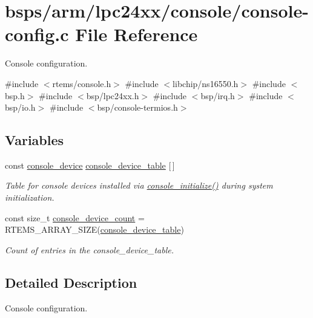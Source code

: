 \hypertarget{arm_2lpc24xx_2console_2console-config_8c}{}\section{bsps/arm/lpc24xx/console/console-\/config.c File Reference}
\label{arm_2lpc24xx_2console_2console-config_8c}


Console configuration.  


{\ttfamily \#include $<$rtems/console.\+h$>$}\newline
{\ttfamily \#include $<$libchip/ns16550.\+h$>$}\newline
{\ttfamily \#include $<$bsp.\+h$>$}\newline
{\ttfamily \#include $<$bsp/lpc24xx.\+h$>$}\newline
{\ttfamily \#include $<$bsp/irq.\+h$>$}\newline
{\ttfamily \#include $<$bsp/io.\+h$>$}\newline
{\ttfamily \#include $<$bsp/console-\/termios.\+h$>$}\newline
\subsection*{Variables}
\begin{DoxyCompactItemize}
\item 
const \mbox{\hyperlink{structconsole__device}{console\+\_\+device}} \mbox{\hyperlink{group__ConsoleTermios_ga7f058e756eb724397922b823131fba5c}{console\+\_\+device\+\_\+table}} \mbox{[}$\,$\mbox{]}
\begin{DoxyCompactList}\small\item\em Table for console devices installed via \mbox{\hyperlink{arm_2raspberrypi_2console_2console-config_8c_a4bdc321ef3ab62a261d77b5dbe075566}{console\+\_\+initialize()}} during system initialization. \end{DoxyCompactList}\item 
const size\+\_\+t \mbox{\hyperlink{group__ConsoleTermios_gabca2c9c9873b0482f9fd306e6bade017}{console\+\_\+device\+\_\+count}} = R\+T\+E\+M\+S\+\_\+\+A\+R\+R\+A\+Y\+\_\+\+S\+I\+ZE(\mbox{\hyperlink{group__ConsoleTermios_ga7f058e756eb724397922b823131fba5c}{console\+\_\+device\+\_\+table}})
\begin{DoxyCompactList}\small\item\em Count of entries in the console\+\_\+device\+\_\+table. \end{DoxyCompactList}\end{DoxyCompactItemize}


\subsection{Detailed Description}
Console configuration. 

